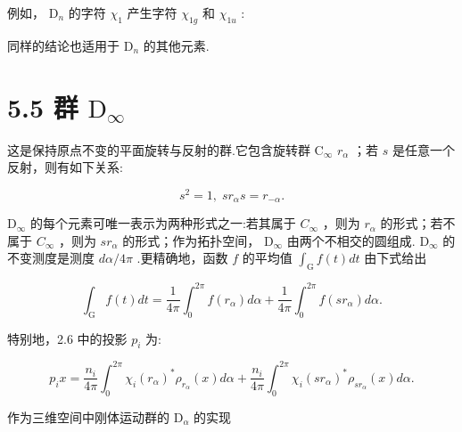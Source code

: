 \documentclass[10pt]{article}
\begin{document}
例如， \({\mathrm{D}}_{n}\) 的字符 \({\chi }_{1}\) 产生字符 \({\chi }_{1g}\) 和 \({\chi }_{1u}\) :

\begin{center}
\end{center}

同样的结论也适用于 \({\mathrm{D}}_{n}\) 的其他元素.

\section*{5.5 群 \({\mathrm{D}}_{\infty }\)}

这是保持原点不变的平面旋转与反射的群.它包含旋转群 \({\mathrm{C}}_{\infty }\)  \({r}_{\alpha }\) ；若 \(s\) 是任意一个反射，则有如下关系:

\[
{s}^{2} = 1,\;s{r}_{\alpha }s = {r}_{-\alpha }.
\]

\({\mathrm{D}}_{\infty }\) 的每个元素可唯一表示为两种形式之一:若其属于 \({C}_{\infty }\) ，则为 \({r}_{\alpha }\) 的形式；若不属于 \({C}_{\infty }\) ，则为 \(s{r}_{\alpha }\) 的形式；作为拓扑空间， \({\mathrm{D}}_{\infty }\) 由两个不相交的圆组成. \({\mathrm{D}}_{\infty }\) 的不变测度是测度 \({d\alpha }/{4\pi }\) .更精确地，函数 \(f\) 的平均值 \({\int }_{\mathrm{G}}f\left( t\right) {dt}\) 由下式给出

\[
{\int }_{\mathrm{G}}f\left( t\right) {dt} = \frac{1}{4\pi }{\int }_{0}^{2\pi }f\left( {r}_{\alpha }\right) {d\alpha } + \frac{1}{4\pi }{\int }_{0}^{2\pi }f\left( {s{r}_{\alpha }}\right) {d\alpha }.
\]

特别地，2.6 中的投影 \({p}_{i}\) 为:

\[
{p}_{i}x = \frac{{n}_{i}}{4\pi }{\int }_{0}^{2\pi }{\chi }_{i}{\left( {r}_{\alpha }\right) }^{ * }{\rho }_{{r}_{\alpha }}\left( x\right) {d\alpha } + \frac{{n}_{i}}{4\pi }{\int }_{0}^{2\pi }{\chi }_{i}{\left( s{r}_{\alpha }\right) }^{ * }{\rho }_{s{r}_{\alpha }}\left( x\right) {d\alpha }.
\]

作为三维空间中刚体运动群的 \({\mathrm{D}}_{\alpha }\) 的实现
\end{document}
